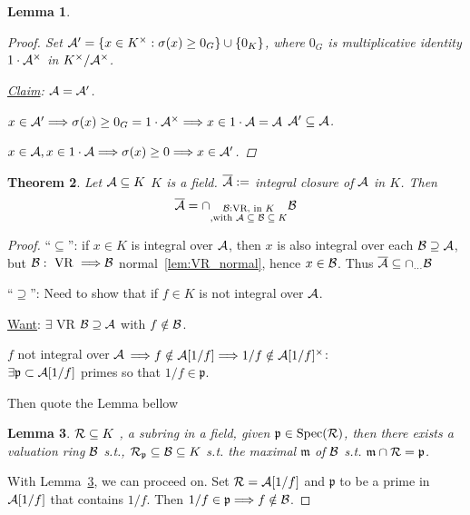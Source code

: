 \documentclass[11pt]{article}
\newtheorem{thm}{Theorem}[section]
\newtheorem{lemma}[thm]{Lemma}
\newcommand{\scm}{{\mathfrak m}}
\newcommand{\scp}{{\mathfrak p}}
\newcommand{\cala}{{\cal A}}
\newcommand{\calb}{{\cal B}}
\newcommand{\calr}{{\cal R}}
\newcommand{\Lrta}{\Longrightarrow}
\begin{document}
\begin{lemma}
\begin{proof}
Set $\cala'=\{x\in K^\times:\sigma(x)\geq 0_G\}\cup\{0_K\}$, where $0_G$ is multiplicative identity $1\cdot\cala^\times$ in $K^\times/\cala^\times$. 

\underline{Claim}: $\cala=\cala'$.

$x\in \cala'\Lrta \sigma(x)\geq 0_G=1\cdot\cala^\times\Lrta x\in 1\cdot\cala=\cala$ $\cala'\subseteq\cala$.

$x\in \cala, x\in 1\cdot\cala\Lrta \sigma(x)\geq 0\Lrta x\in \cala'$.


\end{proof}
\end{lemma}

\begin{thm}\label{thm:integral_closure_VR}
Let $\cala\subseteq K$ $K$ is a field. $\overline{\cala}:=$ integral closure of $\cala$ in $K$. Then 
$$
\overline{\cala}=\cap_{\substack{\calb:\text{VR, in $K$}\\, \text{with $\cala\subseteq \calb\subseteq K$}}}\calb
$$
\end{thm}
\begin{proof}
``$\subseteq$'': if $x\in K$ is integral over $\cala$, then $x$ is also integral over each $\calb\supseteq \cala$, but $\calb: \text{ VR }\Lrta\calb$ normal~\ref{lem:VR_normal}, hence $x\in \calb$. Thus $\overline{\cala}\subseteq \cap_{...}\calb$

``$\supseteq$'': Need to show that if $f\in K$ is not integral over $\cala$.

\underline{Want}: $\exists $ VR $\calb\supseteq \cala$ with $f\notin \calb$.

$f$ not integral over $\cala$ $\Lrta f\notin \cala[1/f]\Lrta 1/f\notin \cala[1/f]^\times$: \\
$\exists \scp\subset\cala[1/f]$ primes so that $1/f\in \scp$.

Then quote the Lemma bellow
\begin{lemma}\label{lem:VR_lieover}
$\calr\subseteq K$ , a subring in a field, given $\scp\in \text{Spec}(\calr)$, then there exists a valuation ring $\calb$ s.t., $\calr_\scp\subseteq\calb\subseteq K$ s.t. the maximal $\scm$ of $\calb$ s.t. $\scm\cap\calr=\scp$.
\end{lemma}

With Lemma~\ref{lem:VR_lieover}, we can proceed on. Set $\calr=\cala[1/f]$ and $\scp$ to be a prime in $\cala[1/f]$ that contains $1/f$. Then $1/f\in\scp\Lrta f\notin\calb$.
\end{proof}
\end{document}
